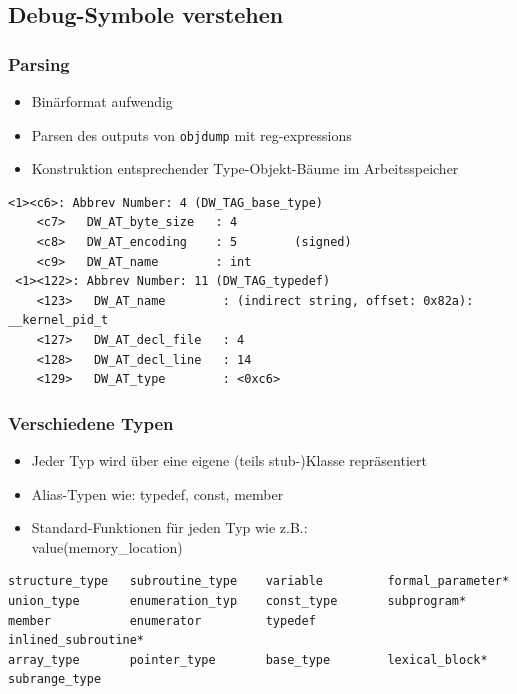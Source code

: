 \documentclass[german]{beamer}
\begin{document}
\subsection{Debug-Symbole verstehen}
\begin{frame}[fragile]
\frametitle{Parsing}
  \begin{itemize}
	\item Binärformat aufwendig
	\item Parsen des outputs von \texttt{objdump} mit reg-expressions
	\item Konstruktion entsprechender Type-Objekt-Bäume im Arbeitsspeicher
  \end{itemize}
\begin{lstlisting}[frame=single,caption=A typical objdump structure,label=lst:objdump]
 <1><c6>: Abbrev Number: 4 (DW_TAG_base_type)
    <c7>   DW_AT_byte_size   : 4
    <c8>   DW_AT_encoding    : 5        (signed)
    <c9>   DW_AT_name        : int
 <1><122>: Abbrev Number: 11 (DW_TAG_typedef)
    <123>   DW_AT_name        : (indirect string, offset: 0x82a): __kernel_pid_t
    <127>   DW_AT_decl_file   : 4
    <128>   DW_AT_decl_line   : 14
    <129>   DW_AT_type        : <0xc6>
\end{lstlisting}
\end{frame}

\begin{frame}[fragile]
\frametitle{Verschiedene Typen}
  \begin{itemize}
	\item Jeder Typ wird über eine eigene (teils stub-)Klasse repräsentiert
	\item Alias-Typen wie: typedef, const, member
	\item Standard-Funktionen für jeden Typ wie z.B.:\\
              value(memory\_location)
  \end{itemize}
\begin{lstlisting}[frame=single,caption=Used types,label=lst:types]
structure_type   subroutine_type    variable         formal_parameter*            
union_type       enumeration_typ    const_type       subprogram* 
member           enumerator         typedef          inlined_subroutine*
array_type       pointer_type       base_type        lexical_block*         
subrange_type                                           
\end{lstlisting}
\end{frame}
  
\end{document}
